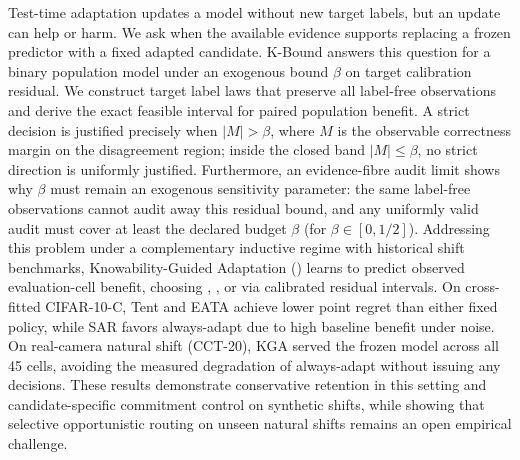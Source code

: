 Test-time adaptation updates a model without new target labels, but an update can help or harm.
We ask when the available evidence supports replacing a frozen predictor with a fixed adapted
candidate. K-Bound answers this question for a binary population model under an exogenous bound
$\beta$ on target calibration residual. We construct target label laws that preserve all
label-free observations and derive the exact feasible interval for paired population benefit. A strict
decision is justified precisely when $|M|>\beta$, where $M$ is the observable correctness margin on the
disagreement region; inside the closed band $|M|\le\beta$, no strict direction is uniformly justified.
Furthermore, an evidence-fibre audit limit shows why $\beta$ must remain an exogenous sensitivity parameter:
the same label-free observations cannot audit away this residual bound, and any uniformly valid audit
must cover at least the declared budget $\beta$ (for $\beta\in[0,1/2]$). Addressing this problem under a complementary inductive
regime with historical shift benchmarks, Knowability-Guided Adaptation (\KGA) learns to predict
observed evaluation-cell benefit, choosing \adapt, \freeze, or \abstain via calibrated residual intervals.
On cross-fitted CIFAR-10-C, Tent and EATA achieve lower point regret than either fixed policy, while
SAR favors always-adapt due to high baseline benefit under noise. On real-camera natural shift (CCT-20),
KGA served the frozen model across all 45 cells, avoiding the measured degradation of always-adapt
without issuing any \adapt decisions. These results demonstrate conservative retention in this setting
and candidate-specific commitment control on synthetic shifts, while showing that selective opportunistic
routing on unseen natural shifts remains an open empirical challenge.

